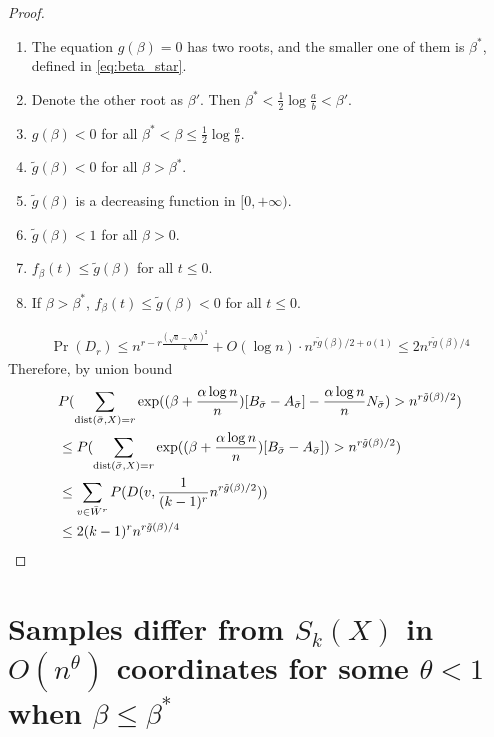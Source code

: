 \documentclass{article}
\begin{document}
\begin{proof}
\begin{lemma}
\begin{enumerate}[label=(\roman*)]
\item The equation $g(\beta) = 0$ has two roots, and the smaller one of them is $\beta^\ast$, defined in \eqref{eq:beta_star}.

\item Denote the other root as $\beta'$. Then
$\beta^\ast< \frac{1}{2}\log\frac{a}{b} <\beta'$.

\item $g(\beta)<0$ for all $\beta^\ast< \beta \le \frac{1}{2}\log\frac{a}{b}$.

\item $\tilde{g}(\beta)<0$ for all $\beta>\beta^\ast$.

\item $\tilde{g}(\beta)$ is a decreasing function in $[0,+\infty)$. 

\item $\tilde{g}(\beta)<1$ for all $\beta>0$.

\item $f_{\beta}(t)\le \tilde{g}(\beta)$ for all $t\le 0$.

\item If $\beta>\beta^\ast$, $f_{\beta}(t)\le \tilde{g}(\beta)<0$ for all $t\le 0$.

\end{enumerate}
\end{lemma}

\begin{align*}
\Pr( D_r) \leq  n^{r-r\frac{(\sqrt{a}-\sqrt{b})^2}{k}} + O(\log n)  \cdot n^{r\tilde{g}(\beta)/2 + o(1)} \leq 2n^{r\tilde{g}(\beta)/4}
\end{align*}
Therefore, by union bound
\begin{align*}
&P(\sum_{\operatorname{dist}(\bar{\sigma}, X)=r} \exp((\beta + \frac{\alpha \log n}{n})[B_{\bar{\sigma}} - A_{\bar{\sigma}}] - \frac{\alpha \log n}{n} N_{\bar{\sigma}}) > n^{r\tilde{g}(\beta)/2}) \\
&\leq P(\sum_{\operatorname{dist}(\bar{\sigma}, X)=r} \exp((\beta + \frac{\alpha \log n}{n})[B_{\bar{\sigma}} - A_{\bar{\sigma}}]) > n^{r\tilde{g}(\beta)/2}) \\
&\leq \sum_{v \in \bar{W}^r} P(D(v, \frac{1}{(k-1)^r} n^{r\tilde{g}(\beta)/2})) \\
& \leq 2(k-1)^r n^{r\tilde{g}(\beta)/4}
\end{align*}
\end{proof}

\section{Samples differ from $S_k(X)$ in $O(n^{\theta})$ coordinates for some $\theta<1$ when $\beta\le\beta^\ast$}
\label{sect:theta}
\end{document}
